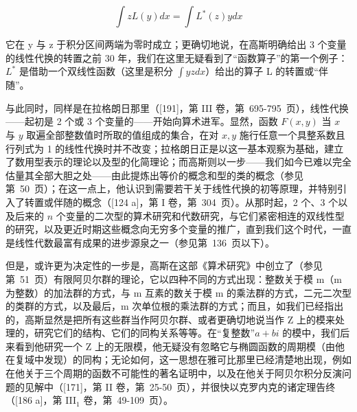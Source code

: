 \[
\int z L (y) d x = \int L ^ {*} (z) y d x
\]

它在 y 与 z 于积分区间两端为零时成立；更确切地说，在高斯明确给出 3 个变量的线性代换的转置之前 30 年，我们在这里无疑看到了“函数算子”的第一个例子：\(L^{*}\) 是借助一个双线性函数（这里是积分 \(\int yzdx\)）给出的算子 L 的转置或“伴随”。

与此同时，同样是在拉格朗日那里（{[}191{]}，第 III 卷，第~695-795~页），线性代换——起初是 2 个或 3 个变量的——开始向算术进军。显然，函数 \(F(x, y)\) 当 \(x\) 与 \(y\) 取遍全部整数值时所取的值组成的集合，在对 \(x, y\) 施行任意一个具整系数且行列式为 1 的线性代换时并不改变；拉格朗日正是以这一基本观察为基础，建立了数用型表示的理论以及型的化简理论；而高斯则以一步——我们如今已难以完全估量其全部大胆之处——由此提炼出等价的概念和型的类的概念（参见第~50~页）；在这一点上，他认识到需要若干关于线性代换的初等原理，并特别引入了转置或伴随的概念（{[}124 a{]}，第 I 卷，第~304~页）。从那时起，2 个、3 个以及后来的 \(n\) 个变量的二次型的算术研究和代数研究，与它们紧密相连的双线性型的研究，以及更近时期这些概念向无穷多个变量的推广，直到我们这个时代，一直是线性代数最富有成果的进步源泉之一（参见第~136~页以下）。

但是，或许更为决定性的一步是，高斯在这部《算术研究》中创立了（参见第~51~页）有限阿贝尔群的理论，它以四种不同的方式出现：整数关于模 m（m 为整数）的加法群的方式，与 m 互素的数关于模 m 的乘法群的方式，二元二次型的类群的方式，以及最后，m 次单位根的乘法群的方式；而且，如我们已经指出的，高斯显然是把所有这些群当作阿贝尔群、或者更确切地说当作 Z 上的模来处理的，研究它们的结构、它们的同构关系等等。在“复整数”\(a + bi\) 的模中，我们后来看到他研究一个 Z 上的无限模，他无疑没有忽略它与椭圆函数的周期模（由他在复域中发现）的同构；无论如何，这一思想在雅可比那里已经清楚地出现，例如在他关于三个周期的函数不可能性的著名证明中，以及在他关于阿贝尔积分反演问题的见解中（{[}171{]}，第 II 卷，第~25-50~页），并很快以克罗内克的诸定理告终（{[}186 a{]}，第 III\(_{1}\) 卷，第~49-109~页）。

